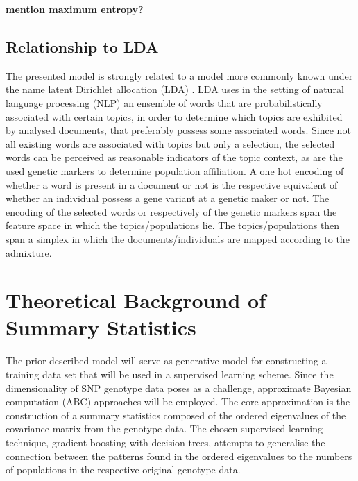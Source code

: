 \documentclass[a4paper, 11pt]{article}
\begin{document}
\textbf{mention maximum entropy?}

\subsection{Relationship to LDA}
The presented model is strongly related to a model more commonly known under the name latent Dirichlet allocation (LDA) \cite{blei2003latent}. LDA uses in the setting of natural language processing (NLP) an ensemble of words that are probabilistically associated with certain topics, in order to determine which topics are exhibited by analysed documents, that preferably possess some associated words. Since not all existing words are associated with topics but only a selection, the selected words can be perceived as reasonable indicators of the topic context, as are the used genetic markers to determine population affiliation. A one hot encoding of whether a word is present in a document or not is the respective equivalent of whether an individual possess a gene variant at a genetic maker or not. The encoding of the selected words or respectively of the genetic markers span the feature space in which the topics/populations lie. The topics/populations then span a simplex in which the documents/individuals are mapped according to the admixture.\\



\section{Theoretical Background of Summary Statistics}

The prior described model will serve as generative model for constructing a training data set that will be used in a supervised learning scheme. Since the dimensionality of SNP genotype data poses as a challenge, approximate Bayesian computation (ABC) approaches will be employed. The core approximation is the construction of a summary statistics composed of the ordered eigenvalues of the covariance matrix from the genotype data. The chosen supervised learning technique, gradient boosting with decision trees, attempts to generalise the connection between the patterns found in the ordered eigenvalues to the numbers of populations in the respective original genotype data.
\end{document}
